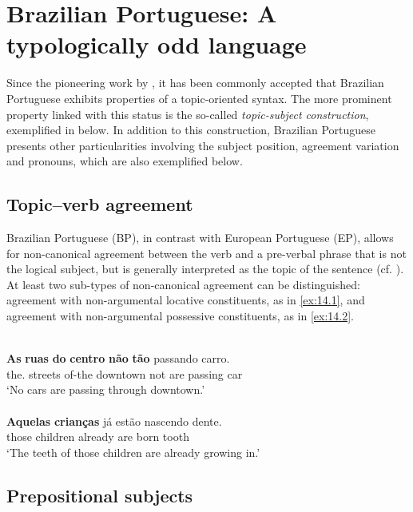 \documentclass[output=paper]{langsci/langscibook}
\begin{document}
\section{Brazilian Portuguese: A typologically odd language}\label{sec:14.2}

Since the pioneering work by \citet{Pontes1987}, it has been commonly accepted
that Brazilian Portuguese exhibits properties of a topic-oriented syntax. The
more prominent property linked with this status is the so-called
\emph{topic-subject construction}, exemplified in  below. In addition to
this construction, Brazilian Portuguese presents other particularities
involving the subject position, agreement variation and pronouns, which are
also exemplified below.

\subsection{Topic--verb agreement}\label{sec:14.2.1}

Brazilian Portuguese (\gls{BP}), in contrast with
European Portuguese (\gls{EP}), allows for
non-canonical agreement between the verb and a pre-verbal phrase that is not
the logical subject, but is generally interpreted as the topic of the sentence
(cf.
\citealt{DuarteKato2008,AvelarGalves2011,Toniette2013,MunhozNaves2012,Nunes2017}).
At least two sub-types of non-canonical agreement can be distinguished:
agreement with non-argumental locative constituents, as in \eqref{ex:14.1},
and agreement with non-argumental possessive constituents, as in
\eqref{ex:14.2}.

\ea\label{ex:14.1}\\
    \gll \textbf{As} \textbf{ruas} \textbf{do} \textbf{centro} \textbf{não} \textbf{tão} passando carro.\\
        the.\Pl{} streets of-the downtown not are passing car\\
    \glt ‘No cars are passing through downtown.’\\
\ex\label{ex:14.2}\\
    \gll \textbf{Aquelas} \textbf{crianças} já estão nascendo dente.\\
        those children already are born tooth\\
    \glt ‘The teeth of those children are already growing in.’
\z

\subsection{Prepositional subjects}\label{sec:14.2.2}
\end{document}
